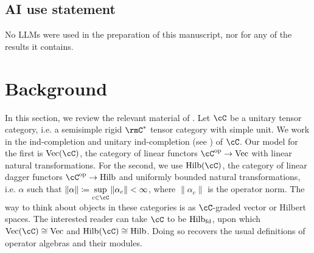 \documentclass[11pt,reqno]{amsart}
\DeclareMathOperator{\op}{op}
\DeclareMathOperator{\Vect}{Vec}
\DeclareMathOperator{\Hilb}{Hilb}
\numberwithin{equation}{section}
\theoremstyle{plain}
\begin{document}
\subsection*{AI use statement}
No LLMs were used in the preparation of this manuscript, nor for any of the results it contains.
\section{Background}
In this section, we review the relevant material of \cite{JP17}.
Let $\cC$ be a unitary tensor category, i.e. a semisimple rigid $\rmC^*$ tensor category with simple unit.
We work in the ind-completion and unitary ind-completion (see \cite{NY16}) of $\cC$.
Our model for the first is $\Vect(\cC)$, the category of linear functors $\cC^{\op} \to \Vect$ with linear natural transformations.
For the second, we use $\Hilb(\cC)$, the category of linear dagger functors $\cC^{\op} \to \Hilb$ and uniformly bounded natural transformations, i.e. $\alpha$ such that $\|\alpha\| \coloneq \sup \limits_{c \in \cC} \|\alpha_c\| < \infty$, where $\|\alpha_c\|$ is the operator norm.
The way to think about objects in these categories is as $\cC$-graded vector or Hilbert spaces.
The interested reader can take $\cC$ to be $\Hilb_{\rm fd}$, upon which $\Vect(\cC) \cong \Vect$ and $\Hilb(\cC) \cong \Hilb$.
Doing so recovers the usual definitions of operator algebras and their modules.
\end{document}
